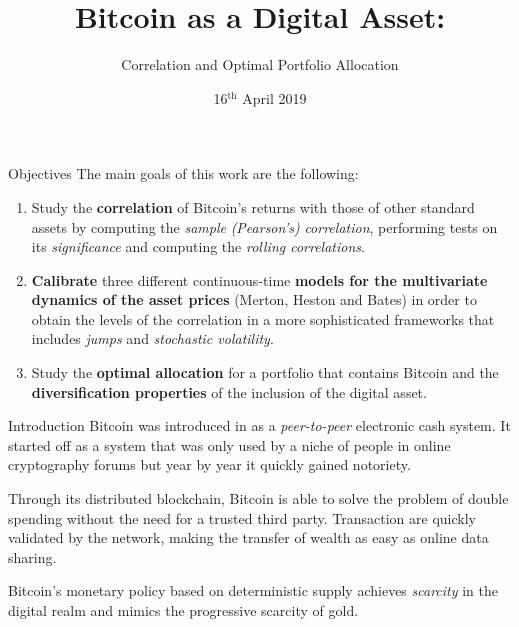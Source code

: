 \documentclass[c, 10pt]{beamer}
\title{Bitcoin as a Digital Asset:}
\subtitle{Correlation and Optimal Portfolio Allocation}
\author[Samuele Vianello]{%
	\usebox{\authbox}
}
\institute{School of Industrial and Information Engineering \\
	Master of Science in Mathematical Engineering}
\date{16$^{\text{th}}$ April 2019}
\begin{document}

    \begin{frame}
    	\bigskip
    	
    	\bigskip
    	\large
        \maketitle
    \end{frame}
	
	\begin{frame}{Objectives}
	The main goals of this work are the following:
		\begin{enumerate}
			\item Study the \textbf{correlation} of Bitcoin's returns with those of other standard assets by computing the \textit{sample} \textit{(Pearson's)} \textit{correlation}, performing tests on its \textit{significance} and computing the \textit{rolling correlations}.
			\item \textbf{Calibrate} three different continuous-time \textbf{models for the multivariate dynamics of the asset prices} (Merton, Heston and Bates) in order to obtain the levels of the correlation in a more sophisticated frameworks that includes \textit{jumps} and \textit{stochastic volatility}.
			\item Study the \textbf{optimal allocation} for a portfolio that contains Bitcoin and the \textbf{diversification properties} of the inclusion of the digital asset. 
		\end{enumerate}
	\end{frame}


\begin{frame}{Introduction}
Bitcoin was introduced in \citep{BTC2008} as a \textit{peer-to-peer} electronic cash system. It started off as a system that was only used by a niche of people in online cryptography forums but year by year it quickly gained notoriety.

\bigskip
Through its distributed blockchain, Bitcoin is able to solve the problem of double spending without the need for a trusted third party. Transaction are quickly validated by the network, making the transfer of wealth as easy as online data sharing.

\bigskip
Bitcoin's monetary policy based on deterministic supply achieves \textit{scarcity} in the digital realm and mimics the progressive scarcity of gold.
\end{frame}
\end{document}
